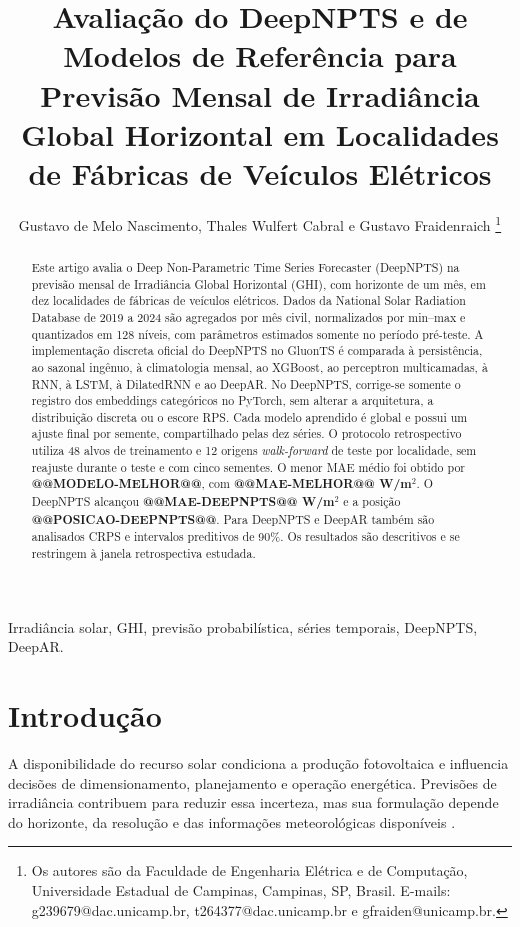\documentclass[10pt,conference,a4paper]{IEEEtran}
\title{Avaliação do DeepNPTS e de Modelos de Referência para Previsão
Mensal de Irradiância Global Horizontal em Localidades de Fábricas de
Veículos Elétricos}
\author{Gustavo de Melo Nascimento, Thales Wulfert Cabral e Gustavo Fraidenraich%
\thanks{Os autores são da Faculdade de Engenharia Elétrica e de Computação,
Universidade Estadual de Campinas, Campinas, SP, Brasil. E-mails:
g239679@dac.unicamp.br, t264377@dac.unicamp.br e gfraiden@unicamp.br.}}
\begin{document}
\maketitle

\begin{abstract}
Este artigo avalia o Deep Non-Parametric Time Series Forecaster (DeepNPTS) na
previsão mensal de Irradiância Global Horizontal (GHI), com horizonte de um
mês, em dez localidades de fábricas de veículos elétricos. Dados da National
Solar Radiation Database de 2019 a 2024 são agregados por mês civil,
normalizados por min--max e quantizados em 128 níveis, com parâmetros estimados
somente no período pré-teste. A implementação discreta oficial do DeepNPTS no
GluonTS é comparada à persistência, ao sazonal ingênuo, à climatologia mensal,
ao XGBoost, ao perceptron multicamadas, à RNN, à LSTM, à DilatedRNN e ao
DeepAR. No DeepNPTS, corrige-se somente o registro dos embeddings categóricos
no PyTorch, sem alterar a arquitetura, a distribuição discreta ou o escore
RPS. Cada modelo aprendido é global e possui um ajuste final por semente,
compartilhado pelas dez séries. O protocolo retrospectivo utiliza 48 alvos de
treinamento e 12 origens \textit{walk-forward} de teste por localidade, sem
reajuste durante o teste e com cinco sementes. O menor MAE médio foi obtido por
\textbf{@@MODELO-MELHOR@@}, com \textbf{@@MAE-MELHOR@@ W/m$^2$}. O DeepNPTS
alcançou \textbf{@@MAE-DEEPNPTS@@ W/m$^2$} e a posição
\textbf{@@POSICAO-DEEPNPTS@@}. Para DeepNPTS e DeepAR também são analisados
CRPS e intervalos preditivos de 90\%. Os resultados são descritivos e se
restringem à janela retrospectiva estudada.
\end{abstract}

\begin{IEEEkeywords}
Irradiância solar, GHI, previsão probabilística, séries temporais, DeepNPTS,
DeepAR.
\end{IEEEkeywords}

\section{Introdução}
\label{sec:introducao}

A disponibilidade do recurso solar condiciona a produção fotovoltaica e
influencia decisões de dimensionamento, planejamento e operação energética.
Previsões de irradiância contribuem para reduzir essa incerteza, mas sua
formulação depende do horizonte, da resolução e das informações meteorológicas
disponíveis \cite{antonanzas2016,voyant2017,yang2018}.
\end{document}
